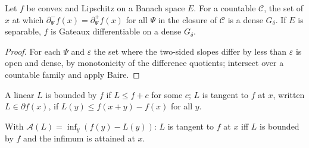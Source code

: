 \begin{theorem}
    \label{thm:tf-16-3}
    \leanok

    Let $f$ be convex and Lipschitz on a Banach space $E$. For a countable $\mathcal C$, the set
    of $x$ at which $\partial^-_\Psi f(x) = \partial^+_\Psi f(x)$ for all $\Psi$ in the closure
    of $\mathcal C$ is a dense $G_\delta$. If $E$ is separable, $f$ is Gateaux differentiable on a
    dense $G_\delta$.
\end{theorem}
\begin{proof}
    \leanok
    For each $\Psi$ and $\varepsilon$ the set where the two-sided slopes differ by less than
    $\varepsilon$ is open and dense, by monotonicity of the difference quotients; intersect over a
    countable family and apply Baire.
\end{proof}

\begin{definition}
    \label{def:tf-16-4}
    \leanok

    A linear $L$ is bounded by $f$ if $L \leq f + c$ for some $c$; $L$ is tangent to $f$ at $x$,
    written $L \in \partial f(x)$, if $L(y) \leq f(x + y) - f(x)$ for all $y$.
\end{definition}

\begin{proposition}[Georgii (16.5)]
    \label{prop:tf-16-5}
    \leanok

    With $\mathcal A(L) = \inf_y (f(y) - L(y))$: $L$ is tangent to $f$ at $x$ iff $L$ is bounded by
    $f$ and the infimum is attained at $x$.
\end{proposition}

